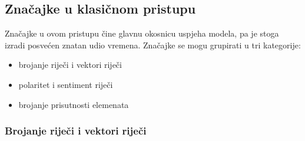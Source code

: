 \documentclass[times, utf8, zavrsni]{fer}
\begin{document}
\subsection{Značajke u klasičnom pristupu}

Značajke u ovom pristupu čine glavnu okosnicu uspjeha modela, pa je stoga izradi posvećen znatan udio vremena. Značajke se mogu grupirati u tri kategorije: \begin{itemize}
\item brojanje riječi i vektori riječi
\item polaritet i sentiment riječi
\item brojanje prisutnosti elemenata
\end{itemize}

\subsubsection{Brojanje riječi i vektori riječi}
\end{document}
